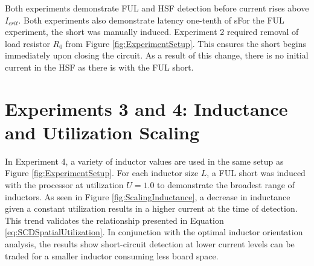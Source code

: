 \documentclass[11pt,compsoc,oneside]{report}
\begin{document}
Both experiments demonstrate FUL and HSF detection before current rises above $I_{crit}$. Both experiments also demonstrate latency one-tenth of sFor the FUL experiment, the short was manually induced. Experiment 2 required removal of load resistor $R_{0}$ from Figure \ref{fig:ExperimentSetup}. This ensures the short begins immediately upon closing the circuit. As a result of this change, there is no initial current in the HSF as there is with the FUL short.

\section{Experiments 3 and 4: Inductance and Utilization Scaling}
In Experiment 4, a variety of inductor values are used in the same setup as Figure \ref{fig:ExperimentSetup}. For each inductor size $L$, a FUL short was induced with the processor at utilization $U = 1.0$ to demonstrate the broadest range of inductors. As seen in Figure \ref{fig:ScalingInductance}, a decrease in inductance given a constant utilization results in a higher current at the time of detection. This trend validates the relationship presented in Equation \ref{eq:SCDSpatialUtilization}. In conjunction with the optimal inductor orientation analysis, the results show short-circuit detection at lower current levels can be traded for a smaller inductor consuming less board space.
\end{document}
